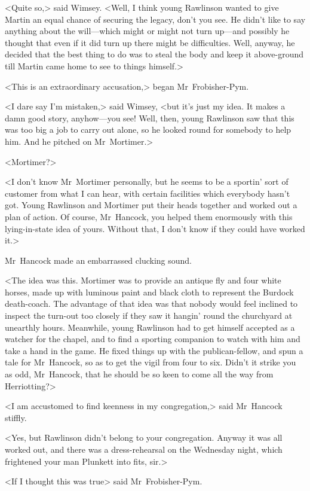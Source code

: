 <Quite so,> said Wimsey. <Well, I think young Rawlinson wanted to give Martin an equal chance of securing the legacy, don't you see. He didn't like to say anything about the will—which might or might not turn up—and possibly he thought that even if it did turn up there might be difficulties. Well, anyway, he decided that the best thing to do was to steal the body and keep it above-ground till Martin came home to see to things himself.>

<This is an extraordinary accusation,> began Mr~Frobisher-Pym.

<I dare say I'm mistaken,> said Wimsey, <but it's just my idea. It makes a damn good story, anyhow—you see! Well, then, young Rawlinson saw that this was too big a job to carry out alone, so he looked round for somebody to help him. And he pitched on Mr~Mortimer.>

<Mortimer?>

<I don't know Mr~Mortimer personally, but he seems to be a sportin' sort of customer from what I can hear, with certain facilities which everybody hasn't got. Young Rawlinson and Mortimer put their heads together and worked out a plan of action. Of course, Mr~Hancock, you helped them enormously with this lying-in-state idea of yours. Without that, I don't know if they could have worked it.>

Mr~Hancock made an embarrassed clucking sound.

<The idea was this. Mortimer was to provide an antique fly and four white horses, made up with luminous paint and black cloth to represent the Burdock death-coach. The advantage of that idea was that nobody would feel inclined to inspect the turn-out too closely if they saw it hangin' round the churchyard at unearthly hours. Meanwhile, young Rawlinson had to get himself accepted as a watcher for the chapel, and to find a sporting companion to watch with him and take a hand in the game. He fixed things up with the publican-fellow, and spun a tale for Mr~Hancock, so as to get the vigil from four to six. Didn't it strike you as odd, Mr~Hancock, that he should be so keen to come all the way from Herriotting?>

<I am accustomed to find keenness in my congregation,> said Mr~Hancock stiffly.

<Yes, but Rawlinson didn't belong to your congregation. Anyway it was all worked out, and there was a dress-rehearsal on the Wednesday night, which frightened your man Plunkett into fits, sir.>

<If I thought this was true\longdash> said Mr~Frobisher-Pym.

